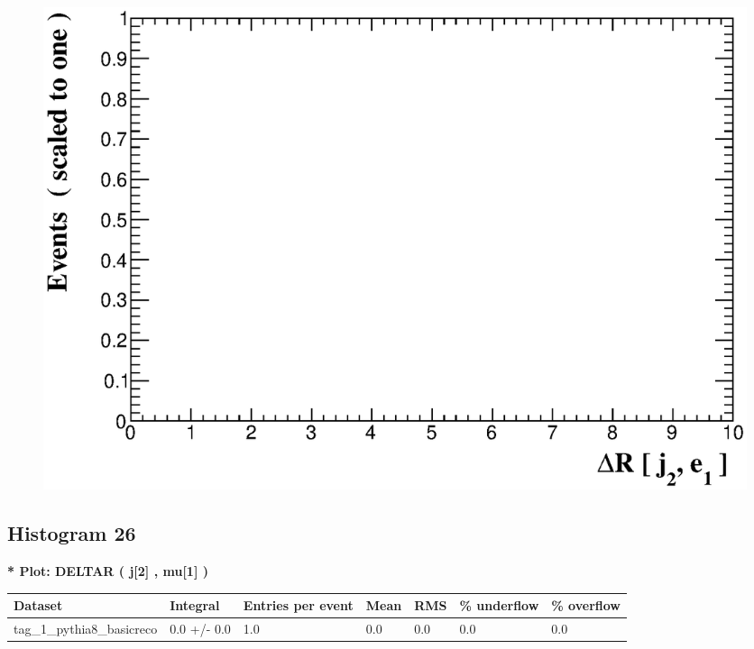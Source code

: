 \documentclass[a4paper, 10pt]{article}
\begin{document}
\begin{figure}[H]
  \begin{center}
    \includegraphics[scale=0.45]{selection_24.eps}\\
\caption{   }
  \end{center}
\end{figure}
      \newpage
\subsection{ Histogram 26}

\textbf{* Plot: DELTAR ( j[2] , mu[1] ) }\\
   \begin{table}[H]
  \begin{center}
    \begin{tabular}{|m{23.0mm}|m{23.0mm}|m{18.0mm}|m{19.0mm}|m{19.0mm}|m{19.0mm}|m{19.0mm}|}
      \hline
      {\cellcolor{yellow}         Dataset}& {\cellcolor{yellow}         Integral}& {\cellcolor{yellow}         Entries per event}& {\cellcolor{yellow}         Mean}& {\cellcolor{yellow}         RMS}& {\cellcolor{yellow}         \% underflow}& {\cellcolor{yellow}         \% overflow}\\
      \hline
      {\cellcolor{white}         tag\_1\_pythia8\_basicreco}& {\cellcolor{white}         0.0 +/\-- 0.0}& {\cellcolor{white}         1.0}& {\cellcolor{white}         0.0}& {\cellcolor{white}         0.0}& {\cellcolor{green}         0.0}& {\cellcolor{green}         0.0}\\
\hline
    \end{tabular}
  \end{center}
\end{table}
\end{document}
